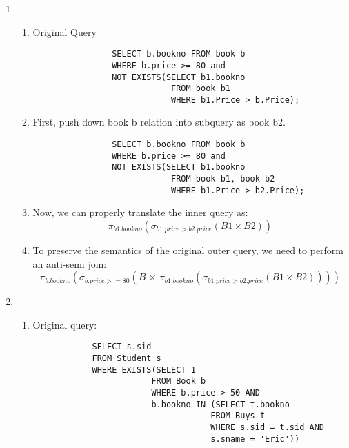 \documentclass{article}
\begin{document}
\begin{enumerate}
\begin{enumerate}
\begin{enumerate}
        \end{enumerate}

        \item %

        \begin{enumerate}
            \item Original Query
            \begin{lstlisting}
                SELECT b.bookno FROM book b
                WHERE b.price >= 80 and
                NOT EXISTS(SELECT b1.bookno
                            FROM book b1
                            WHERE b1.Price > b.Price);
            \end{lstlisting}

            \item First, push down book b relation into subquery as book b2.
            \begin{lstlisting}
                SELECT b.bookno FROM book b
                WHERE b.price >= 80 and
                NOT EXISTS(SELECT b1.bookno
                            FROM book b1, book b2
                            WHERE b1.Price > b2.Price);
            \end{lstlisting}

            \item Now, we can properly translate the inner query as:
            \begin{displaymath}
                \pi_{b1.bookno}(\sigma_{b1.price>b2.price}(B1 \times B2))
            \end{displaymath}

            \item To preserve the semantics of the original outer query, we need to perform an anti-semi join:
            \begin{displaymath}
                \pi_{b.bookno}(\sigma_{b.price >= 80}(B \ \overline{\ltimes}\ \pi_{b1.bookno}(\sigma_{b1.price>b2.price}(B1 \times B2))))
            \end{displaymath}

        \end{enumerate}
        \newpage
        \item %
        \begin{enumerate}
            \item Original query:
            \begin{lstlisting}
            SELECT s.sid
            FROM Student s
            WHERE EXISTS(SELECT 1
                        FROM Book b
                        WHERE b.price > 50 AND
                        b.bookno IN (SELECT t.bookno
                                    FROM Buys t
                                    WHERE s.sid = t.sid AND
                                    s.sname = 'Eric'))


\end{lstlisting}
\end{enumerate}
\end{enumerate}
\end{enumerate}
\end{document}
